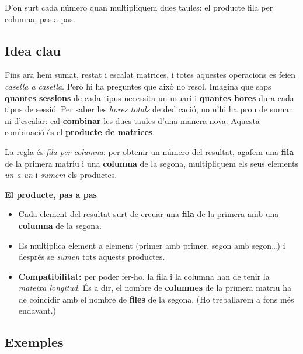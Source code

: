 %
{D'on surt cada número quan multipliquem dues taules: el producte fila per columna, pas a pas.}

\subsection{Idea clau}

Fins ara hem sumat, restat i escalat matrices, i totes aquestes operacions es
feien \emph{casella a casella}. Però hi ha preguntes que això no resol. Imagina
que saps \textbf{quantes sessions} de cada tipus necessita un usuari i
\textbf{quantes hores} dura cada tipus de sessió. Per saber les \emph{hores
totals} de dedicació, no n'hi ha prou de sumar ni d'escalar: cal \textbf{combinar}
les dues taules d'una manera nova. Aquesta combinació és el \textbf{producte de
matrices}.

La regla és \emph{fila per columna}: per obtenir un número del resultat, agafem
una \textbf{fila} de la primera matriu i una \textbf{columna} de la segona,
multipliquem els seus elements \emph{un a un} i \emph{sumem} els productes.

\begin{idea}
\textbf{El producte, pas a pas}
\begin{itemize}[leftmargin=1.4em, itemsep=2pt]
  \item Cada element del resultat surt de creuar una \textbf{fila} de la primera
        amb una \textbf{columna} de la segona.
  \item Es multiplica element a element (primer amb primer, segon amb segon\dots)
        i després se \emph{sumen} tots aquests productes.
  \item \textbf{Compatibilitat:} per poder fer-ho, la fila i la columna han de
        tenir la \emph{mateixa longitud}. És a dir, el nombre de \textbf{columnes}
        de la primera matriu ha de coincidir amb el nombre de \textbf{files} de la
        segona. (Ho treballarem a fons més endavant.)
\end{itemize}
\end{idea}

\subsection{Exemples}

